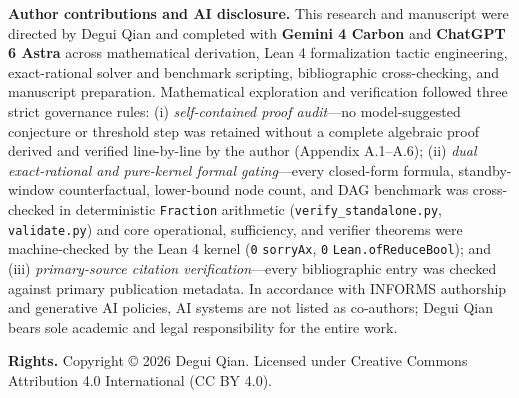 \documentclass[11pt,a4paper]{article}
\begin{document}
\textbf{Author contributions and AI disclosure.} This research and
manuscript were directed by Degui Qian and completed with \textbf{Gemini
4 Carbon} and \textbf{ChatGPT 6 Astra} across mathematical derivation,
Lean 4 formalization tactic engineering, exact-rational solver and
benchmark scripting, bibliographic cross-checking, and manuscript
preparation. Mathematical exploration and verification followed three
strict governance rules: (i) \emph{self-contained proof audit}---no
model-suggested conjecture or threshold step was retained without a
complete algebraic proof derived and verified line-by-line by the author
(Appendix A.1--A.6); (ii) \emph{dual exact-rational and pure-kernel
formal gating}---every closed-form formula, standby-window
counterfactual, lower-bound node count, and DAG benchmark was
cross-checked in deterministic \texttt{Fraction} arithmetic
(\texttt{verify\_standalone.py}, \texttt{validate.py}) and core
operational, sufficiency, and verifier theorems were machine-checked by
the Lean 4 kernel (\texttt{0} \texttt{sorryAx}, \texttt{0}
\texttt{Lean.ofReduceBool}); and (iii) \emph{primary-source citation
verification}---every bibliographic entry was checked against primary
publication metadata. In accordance with INFORMS authorship and
generative AI policies, AI systems are not listed as co-authors; Degui
Qian bears sole academic and legal responsibility for the entire work.

\textbf{Rights.} Copyright © 2026 Degui Qian. Licensed under Creative
Commons Attribution 4.0 International (CC BY 4.0).

\clearpage
\begingroup
{}
\small
\setlength{\bibsep}{4.5pt}


\endgroup
\end{document}
